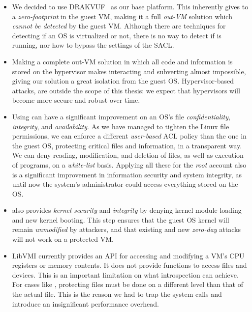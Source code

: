 \begin{itemize}
\item We decided to use DRAKVUF~\cite{lengyel2014drakvuf} as our base platform. This inherently gives to  a \emph{zero-footprint} in the guest \ac{VM}, making it a full \emph{out-\ac{VM}} solution which \emph{cannot be detected} by the guest \ac{VM}. Although there are techniques for detecting if an \ac{OS} is virtualized or not, there is no way to detect if  is running, nor how to bypass the settings of the \ac{SACL}.

\item Making  a complete out-\ac{VM} solution in which all code and information is stored on the hypervisor makes interacting and subverting  almost impossible, giving our solution a great isolation from the guest \ac{OS}. Hypervisor-based attacks, are outside the scope of this thesis: we expect that hypervisors will become more secure and robust over time.

\item Using  can have a significant improvement on an \ac{OS}'s file \emph{confidentiality}, \emph{integrity}, and \emph{availability}. As we have managed to tighten the Linux file permissions, we can enforce a different \emph{user-based}  \ac{ACL} policy than the one in the guest \ac{OS}, protecting critical files and information, in a transparent way. We can deny reading, modification, and deletion of files, as well as execution of programs, on a \emph{white-list} basis. Applying all these for the \emph{root} account also is a significant improvement in information security and system integrity, as until now the system's administrator could access everything stored on the \ac{OS}.

\item {} also provides \emph{kernel security} and \emph{integrity} by denying kernel module loading and new kernel booting. This step ensures that the guest \ac{OS} kernel will remain \emph{unmodified} by attackers, and that existing and new \emph{zero-day} attacks will not work on a  protected \ac{VM}.

\item LibVMI currently provides an \ac{API} for accessing and modifying a \ac{VM}'s \ac{CPU} registers or memory contents. It does not provide functions to access files and devices. This is an important limitation on what introspection can achieve. For cases like , protecting files must be done on a different level than that of the actual file. This is the reason we had to trap the system calls and introduce an insignificant performance overhead.


\end{itemize}
